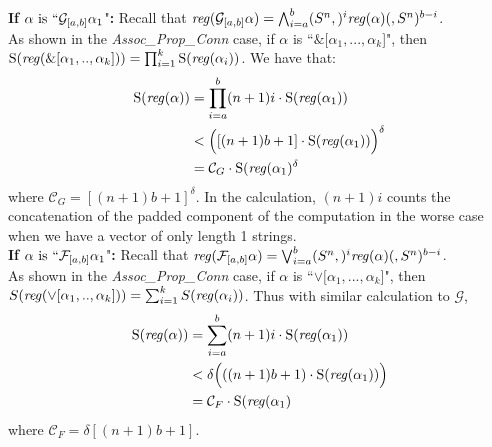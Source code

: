 \documentclass[runningheads]{llncs}
\begin{document}
 \textbf{If} $\alpha \text{ is } ``\mathcal{G}_{[a,b]} \alpha_{1}$"\textbf{:}
 Recall that $\text{\emph{reg}}(\mathcal{G}_{[a,b]} \alpha) = \bigwedge_{i=a}^{b} (S^n,)^i \text{\emph{reg}}(\alpha) (,S^n)^{b-i}$.\\
 As shown in the \textit{Assoc\_Prop\_Conn} case, if $\alpha$ is ``$\&[\alpha_1, ... ,\alpha_k$]", then \\
 $\text{S(\emph{reg}}(\& [\alpha_{1}, .., \alpha_{k}])) = 
    \prod_{i=1}^{k} \text{S(\emph{reg}}(\alpha_{i}))$. We have that:
 \begin{align*}
     \text{S(\emph{reg}}(\alpha)) &= \prod_{i=a}^{b} (n+1)i \cdot \text{S(\emph{reg}}(\alpha_{1}))\\
     &< \Bigl([(n+1)b+1] \cdot \text{S(\emph{reg}}(\alpha_1))\Bigl)^\delta \\
     &= \mathcal{C}_{G} \cdot \text{S(\emph{reg}}(\alpha_1)^\delta 
 \end{align*}
 where $\mathcal{C}_{G} = [(n+1)b+1]^{\delta}$.
 In the calculation, $(n+1)i$ counts the concatenation of the padded component of the computation in the worse case when we have a vector of only length 1 strings. \\


 \textbf{If} $\alpha \text{ is } ``\mathcal{F}_{[a,b]} \alpha_{1}$"\textbf{:}
 Recall that $\text{\emph{reg}}(\mathcal{F}_{[a,b]} \alpha) = \bigvee_{i=a}^{b} (S^n,)^i \text{\emph{reg}}(\alpha)(,S^n)^{b-i}$. \\
 As shown in the \textit{Assoc\_Prop\_Conn} case, if $\alpha$ is ``$\lor[\alpha_1, ... ,\alpha_k$]", then \\
 $S(\text{\emph{reg}}(\lor [\alpha_{1}, .., \alpha_{k}])) = 
    \sum_{i=1}^{k} S(\text{\emph{reg}}(\alpha_{i}))$. Thus with similar calculation to $\mathcal{G}$,
 \begin{align*}
     \text{S(\emph{reg}}(\alpha)) &= \sum_{i=a}^{b} (n+1)i \cdot \text{S(\emph{reg}}(\alpha_{1})) \\
     &< \delta\Bigl(((n+1)b+1) \cdot \text{S(\emph{reg}}(\alpha_1))\Bigl) \\
     &= \mathcal{C}_{F} \cdot \text{S(\emph{reg}}(\alpha_1)
 \end{align*}
 where $\mathcal{C}_{F} = \delta[(n+1)b+1]$.
 
\end{document}
